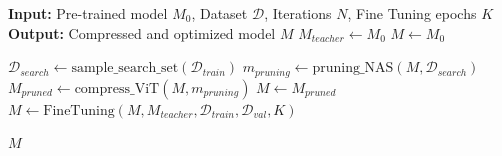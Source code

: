 \begin{algorithm}[H]
\caption{Framework di Compressione Iterativo}
\label{alg:framework_completo}
\begin{algorithmic}[1]
    \State \textbf{Input:} Pre-trained model $M_0$, Dataset $\mathcal{D}$, Iterations $N$, Fine Tuning epochs $K$
    \State \textbf{Output:} Compressed and optimized model $M$
    \State $M_{teacher} \gets M_0$ 
    \State $M \gets M_0$
    
        \State $\mathcal{D}_{search} \gets \text{sample\_search\_set}(\mathcal{D}_{train})$ 
        \State $m_{pruning} \gets \text{pruning\_NAS}(M, \mathcal{D}_{search})$ 
        \State $M_{pruned} \gets \text{compress\_ViT}(M, m_{pruning})$ 
        \State $M \gets M_{pruned}$ 
        \State $M \gets \text{FineTuning}(M, M_{teacher}, \mathcal{D}_{train}, \mathcal{D}_{val}, K)$
    \EndFor
    
    \State \Return $M$
\end{algorithmic}
\end{algorithm}

